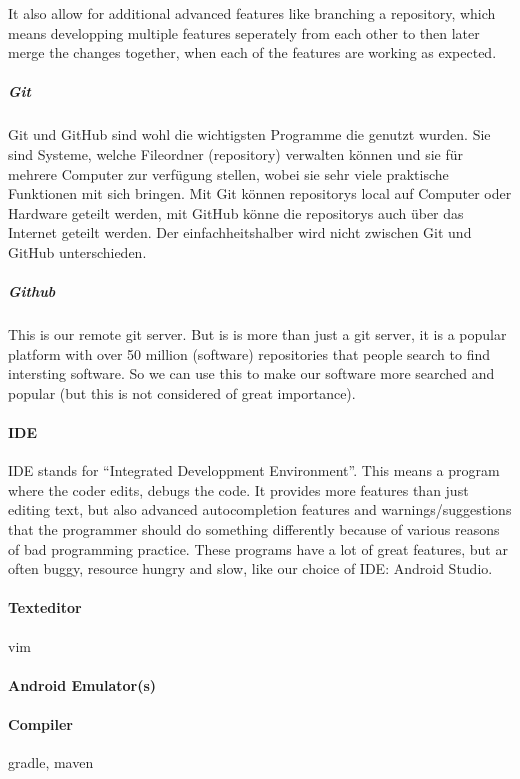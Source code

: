 \documentclass[a4paper,11pt]{article}
\begin{document}
It also allow for additional advanced features like branching a repository, which means developping multiple features seperately from each other to then later merge the changes together, when each of the features are working as expected.

\subparagraph{Git}

Git und GitHub sind wohl die wichtigsten Programme die genutzt wurden. Sie sind Systeme, welche Fileordner (repository) verwalten können und sie für mehrere Computer zur verfügung stellen, 
wobei sie sehr viele praktische Funktionen mit sich bringen. Mit Git können repositorys local auf Computer oder Hardware geteilt werden, mit GitHub könne die repositorys auch 
über das Internet geteilt werden. Der einfachheitshalber wird nicht zwischen Git und GitHub unterschieden. 

\subparagraph{Github}

This is our remote git server. But is is more than just a git server, it is a popular platform with over 50 million (software) repositories that people search to find intersting software. So we can use this to make our software more searched and popular (but this is not considered of great importance).

\paragraph{IDE}
IDE stands for ``Integrated Developpment Environment''. This means a program where the coder edits, debugs the code. It provides more features than just editing text, but also advanced autocompletion features and warnings/suggestions that the programmer should do something differently because of various reasons of bad programming practice. These programs have a lot of great features, but ar often buggy, resource hungry and slow, like our choice of IDE: Android Studio.
\paragraph{Texteditor}
vim

\paragraph{Android Emulator(s)}

\paragraph{Compiler}
gradle, maven
\end{document}

